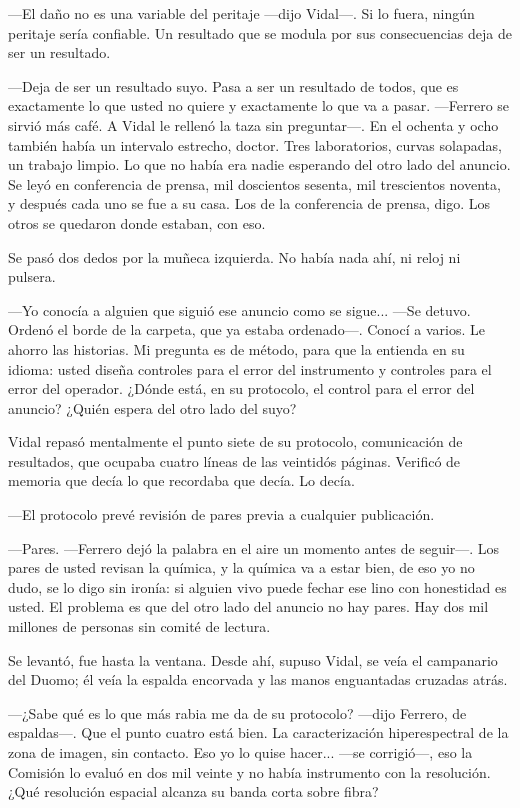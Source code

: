 ---El daño no es una variable del peritaje ---dijo Vidal---. Si lo fuera, ningún peritaje sería confiable. Un resultado que se modula por sus consecuencias deja de ser un resultado.

---Deja de ser un resultado suyo. Pasa a ser un resultado de todos, que es exactamente lo que usted no quiere y exactamente lo que va a pasar. ---Ferrero se sirvió más café. A Vidal le rellenó la taza sin preguntar---. En el ochenta y ocho también había un intervalo estrecho, doctor. Tres laboratorios, curvas solapadas, un trabajo limpio. Lo que no había era nadie esperando del otro lado del anuncio. Se leyó en conferencia de prensa, mil doscientos sesenta, mil trescientos noventa, y después cada uno se fue a su casa. Los de la conferencia de prensa, digo. Los otros se quedaron donde estaban, con eso.

Se pasó dos dedos por la muñeca izquierda. No había nada ahí, ni reloj ni pulsera.

---Yo conocía a alguien que siguió ese anuncio como se sigue... ---Se detuvo. Ordenó el borde de la carpeta, que ya estaba ordenado---. Conocí a varios. Le ahorro las historias. Mi pregunta es de método, para que la entienda en su idioma: usted diseña controles para el error del instrumento y controles para el error del operador. ¿Dónde está, en su protocolo, el control para el error del anuncio? ¿Quién espera del otro lado del suyo?

Vidal repasó mentalmente el punto siete de su protocolo, comunicación de resultados, que ocupaba cuatro líneas de las veintidós páginas. Verificó de memoria que decía lo que recordaba que decía. Lo decía.

---El protocolo prevé revisión de pares previa a cualquier publicación.

---Pares. ---Ferrero dejó la palabra en el aire un momento antes de seguir---. Los pares de usted revisan la química, y la química va a estar bien, de eso yo no dudo, se lo digo sin ironía: si alguien vivo puede fechar ese lino con honestidad es usted. El problema es que del otro lado del anuncio no hay pares. Hay dos mil millones de personas sin comité de lectura.

Se levantó, fue hasta la ventana. Desde ahí, supuso Vidal, se veía el campanario del Duomo; él veía la espalda encorvada y las manos enguantadas cruzadas atrás.

---¿Sabe qué es lo que más rabia me da de su protocolo? ---dijo Ferrero, de espaldas---. Que el punto cuatro está bien. La caracterización hiperespectral de la zona de imagen, sin contacto. Eso yo lo quise hacer... ---se corrigió---, eso la Comisión lo evaluó en dos mil veinte y no había instrumento con la resolución. ¿Qué resolución espacial alcanza su banda corta sobre fibra?

